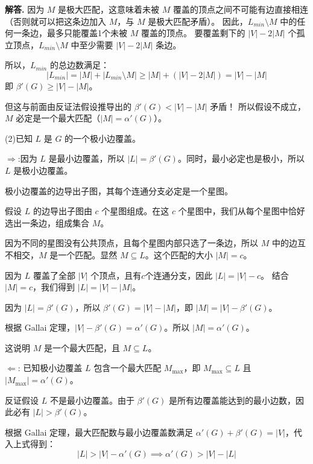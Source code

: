 \documentclass[12pt, a4paper, oneside]{ctexart}
\newenvironment{solution}{\par\noindent\textbf{解答. }}{\par}
\begin{document}
\begin{solution}
    因为 $M$ 是极大匹配，这意味着未被 $M$ 覆盖的顶点之间不可能有边直接相连（否则就可以把这条边加入 $M$，与 $M$ 是极大匹配矛盾）。
    因此，$L_{min} \setminus M$ 中的任何一条边，最多只能覆盖1个未被 $M$ 覆盖的顶点。
    要覆盖剩下的 $|V| - 2|M|$ 个孤立顶点，$L_{min} \setminus M$ 中至少需要 $|V| - 2|M|$ 条边。
    
    所以，$L_{min}$ 的总边数满足：
    \[ |L_{min}| = |M| + |L_{min} \setminus M| \ge |M| + (|V| - 2|M|) = |V| - |M| \]
    即 $\beta'(G) \ge |V| - |M|$。

    但这与前面由反证法假设推导出的 $\beta'(G) < |V| - |M|$ 矛盾！
    所以假设不成立，$M$ 必定是一个最大匹配（$|M| = \alpha'(G)$）。


\vspace{1em}

(2)已知 $L$ 是 $G$ 的一个极小边覆盖。

\vspace{0.5em}
$\Rightarrow$:因为 $L$ 是最小边覆盖，所以 $|L| = \beta'(G)$。同时，最小必定也是极小，所以 $L$ 是极小边覆盖。
    
极小边覆盖的边导出子图，其每个连通分支必定是一个星图。
     
假设 $L$ 的边导出子图由 $c$ 个星图组成。在这 $c$ 个星图中，我们从每个星图中恰好选出一条边，组成集合 $M$。
     
因为不同的星图没有公共顶点，且每个星图内部只选了一条边，所以 $M$ 中的边互不相交，$M$ 是一个匹配。显然 $M \subseteq L$。这个匹配的大小 $|M| = c$。
     
因为 $L$ 覆盖了全部 $|V|$ 个顶点，且有$c$个连通分支，因此 $|L| = |V| - c$。
结合 $|M| = c$，我们得到 $|L| = |V| - |M|$。
     
因为 $|L| = \beta'(G)$，所以 $\beta'(G) = |V| - |M|$，即 $|M| = |V| - \beta'(G)$。
     
根据 Gallai 定理，$|V| - \beta'(G) = \alpha'(G)$。所以 $|M| = \alpha'(G)$。
     
这说明 $M$ 是一个最大匹配，且 $M \subseteq L$。

\vspace{0.5em}
$\Leftarrow$:
    已知极小边覆盖 $L$ 包含一个最大匹配 $M_{\text{max}}$，即 $M_{\text{max}} \subseteq L$ 且 $|M_{\text{max}}| = \alpha'(G)$。
     
    反证假设 $L$ 不是最小边覆盖。由于 $\beta'(G)$ 是所有边覆盖能达到的最小边数，因此必有 $|L| > \beta'(G)$。
     
    根据 Gallai 定理，最大匹配数与最小边覆盖数满足 $\alpha'(G) + \beta'(G) = |V|$，代入上式得到：
    \[ |L| > |V| - \alpha'(G) \implies \alpha'(G) > |V| - |L| \]
     

\end{solution}
\end{document}
